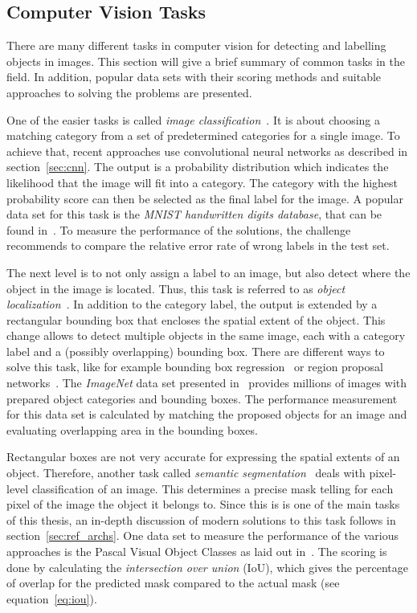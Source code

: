 \subsection{Computer Vision Tasks}
There are many different tasks in computer vision for detecting and labelling objects in images. This section will give a brief summary of common tasks in the field. In addition, popular data sets with their scoring methods and suitable approaches to solving the problems are presented.

One of the easier tasks is called \emph{image classification}~\cite[p.~98]{DLbook16}. It is about choosing a matching category from a set of predetermined categories for a single image. To achieve that, recent approaches use convolutional neural networks as described in section~\ref{sec:cnn}. The output is a probability distribution which indicates the likelihood that the image will fit into a category. The category with the highest probability score can then be selected as the final label for the image. A popular data set for this task is the \emph{MNIST handwritten digits database}, that can be found in~\cite{mnist10}. To measure the performance of the solutions, the challenge recommends to compare the relative error rate of wrong labels in the test set.

The next level is to not only assign a label to an image, but also detect where the object in the image is located. Thus, this task is referred to as \emph{object localization}~\cite{rcnn14}. In addition to the category label, the output is extended by a rectangular bounding box that encloses the spatial extent of the object. This change allows to detect multiple objects in the same image, each with a category label and a (possibly overlapping) bounding box. There are different ways to solve this task, like for example bounding box regression~\cite{obj_detection13} or region proposal networks~\cite{ff-rcnn14}. The \emph{ImageNet} data set presented in~\cite{imgnet09} provides millions of images with prepared object categories and bounding boxes. The performance measurement for this data set is calculated by matching the proposed objects for an image and evaluating overlapping area in the bounding boxes.

Rectangular boxes are not very accurate for expressing the spatial extents of an object. Therefore, another task called \emph{semantic segmentation}~\cite{weakseg15} deals with pixel-level classification of an image. This determines a precise mask telling for each pixel of the image the object it belongs to. Since this is is one of the main tasks of this thesis, an in-depth discussion of modern solutions to this task follows in section~\ref{sec:ref_archs}. One data set to measure the performance of the various approaches is the Pascal Visual Object Classes as laid out in~\cite{pascal_voc15}. The scoring is done by calculating the \emph{intersection over union} (IoU), which gives the percentage of overlap for the predicted mask compared to the actual mask (see equation~\ref{eq:iou}).

